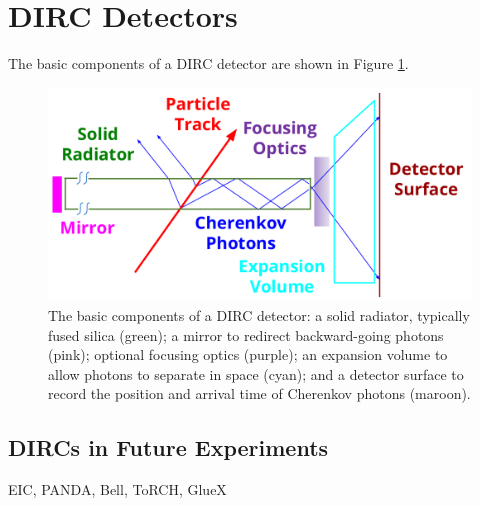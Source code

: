 \section{DIRC Detectors}
The basic components of a DIRC detector are shown in Figure \ref{fig:dircbasics}.

\begin{figure}[ht]
	\centering
	\includegraphics[scale=0.7]{figures/DIRC_components.pdf}
	\caption{The basic components of a DIRC detector: a solid radiator, typically fused silica (green); a mirror to redirect backward-going photons (pink); optional focusing optics (purple); an expansion volume to allow photons to separate in space (cyan); and a detector surface to record the position and arrival time of Cherenkov photons (maroon).}
	\label{fig:dircbasics}
\end{figure}

\subsection{DIRCs in Future Experiments}
EIC, PANDA, Bell, ToRCH, GlueX
